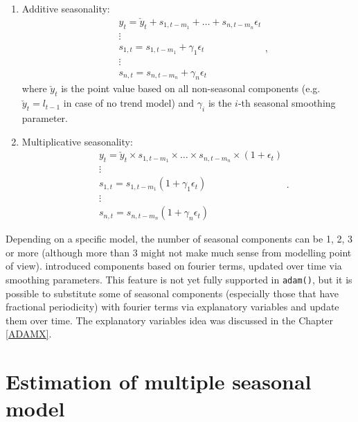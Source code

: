 \documentclass[
]{book}
\theoremstyle{definition}
\theoremstyle{definition}
\theoremstyle{definition}
\theoremstyle{definition}
\theoremstyle{remark}
\begin{document}
\begin{enumerate}
\def\labelenumi{\arabic{enumi}.}
\item
  Additive seasonality:
  \begin{equation}
    \begin{aligned}
   & {y}_{t} = \check{y}_t + s_{1,t-m_1} + \dots + s_{n,t-m_n} \epsilon_t \\
   & \vdots \\
   & s_{1,t} = s_{1,t-m_1} + \gamma_1 \epsilon_t \\
   & \vdots \\
   & s_{n,t} = s_{n,t-m_n} + \gamma_n \epsilon_t
    \end{aligned},
    \label{eq:ETSADAMAdditiveSeasonality}
  \end{equation}
  where \(\check{y}_t\) is the point value based on all non-seasonal components (e.g.~\(\check{y}_t=l_{t-1}\) in case of no trend model) and \(\gamma_i\) is the \(i\)-th seasonal smoothing parameter.
\item
  Multiplicative seasonality:
  \begin{equation}
    \begin{aligned}
   & {y}_{t} = \check{y}_t \times s_{1,t-m_1} \times \dots \times s_{n,t-m_n} \times(1+\epsilon_t) \\
   & \vdots \\
   & s_{1,t} = s_{1,t-m_1} (1 + \gamma_1 \epsilon_t) \\
   & \vdots \\
   & s_{n,t} = s_{n,t-m_n} (1+ \gamma_n \epsilon_t)
    \end{aligned}.
  \label{eq:ETSADAMMultiplicativeSeasonality}
  \end{equation}
\end{enumerate}

Depending on a specific model, the number of seasonal components can be 1, 2, 3 or more (although more than 3 might not make much sense from modelling point of view). \citet{DeLivera2010} introduced components based on fourier terms, updated over time via smoothing parameters. This feature is not yet fully supported in \texttt{adam()}, but it is possible to substitute some of seasonal components (especially those that have fractional periodicity) with fourier terms via explanatory variables and update them over time. The explanatory variables idea was discussed in the Chapter \ref{ADAMX}.

\hypertarget{estimation-of-multiple-seasonal-model}{%
\section{Estimation of multiple seasonal model}\label{estimation-of-multiple-seasonal-model}}
\end{document}
